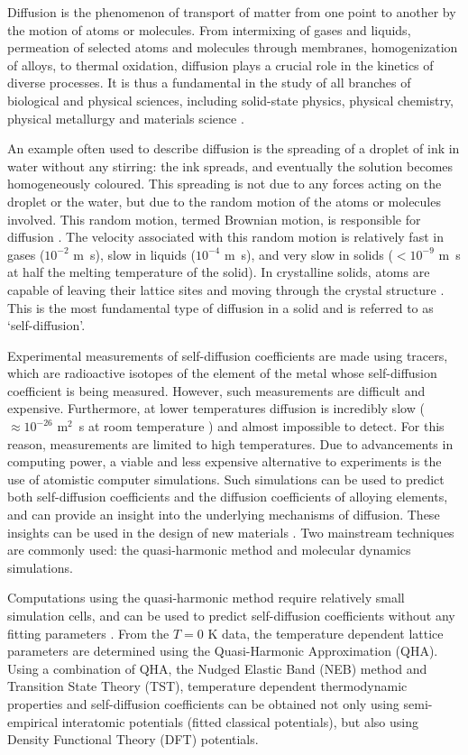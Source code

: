 \documentclass{article}
\begin{document}
Diffusion is the phenomenon of transport of matter from one point to another by the motion of atoms or molecules. From intermixing of gases and liquids, permeation of selected atoms and molecules through membranes, homogenization of alloys, to thermal oxidation, diffusion plays a crucial role in the kinetics of diverse processes. It is thus a fundamental in the study of all branches of biological and physical sciences, including solid-state physics, physical chemistry, physical metallurgy and materials science \cite{Mehrer2007}.

An example often used to describe diffusion is the spreading of a droplet of ink in water without any stirring: the ink spreads, and eventually the solution becomes homogeneously coloured. This spreading is not due to any forces acting on the droplet or the water, but due to the random motion of the atoms or molecules involved. This random motion, termed Brownian motion, is responsible for diffusion \cite{Einstein1905}. The velocity associated with this random motion is relatively fast in gases ($10^{-2}$ m\si{\per\second}), slow in liquids ($10^{-4}$ m\si{\per\second}), and very slow in solids ($<10^{-9}$ m\si{\per\second} at half the melting temperature of the solid). In crystalline solids, atoms are capable of leaving their lattice sites and moving through the crystal structure \cite{Mehrer2007}. This is the most fundamental type of diffusion in a solid and is referred to as \enquote*{self-diffusion}.

Experimental measurements of self-diffusion coefficients are made using tracers, which are radioactive isotopes of the element of the metal whose self-diffusion coefficient is being measured. However, such measurements are difficult and expensive. Furthermore, at lower temperatures diffusion is incredibly slow ($\approx10^{-26}\text{ m}^2$\si{\per\second} at room temperature \cite{Mantina2008}) and almost impossible to detect. For this reason, measurements are limited to high temperatures. Due to advancements in computing power, a viable and less expensive alternative to experiments is the use of atomistic computer simulations. Such simulations can be used to predict both self-diffusion coefficients and the diffusion coefficients of alloying elements, and can provide an insight into the underlying mechanisms of diffusion. These insights can be used in the design of new materials \cite{Mishin2005}. Two mainstream techniques are commonly used: the quasi-harmonic method and molecular dynamics simulations.

Computations using the quasi-harmonic method require relatively small simulation cells, and can be used to predict self-diffusion coefficients without any fitting parameters \cite{Mantina2008}. From the $T=0$ K data, the temperature dependent lattice parameters are determined using the Quasi-Harmonic Approximation (QHA). Using a combination of QHA, the Nudged Elastic Band (NEB) method and Transition State Theory (TST), temperature dependent thermodynamic properties and self-diffusion coefficients can be obtained not only using semi-empirical interatomic potentials (fitted classical potentials), but also using Density Functional Theory (DFT) potentials.
\end{document}
